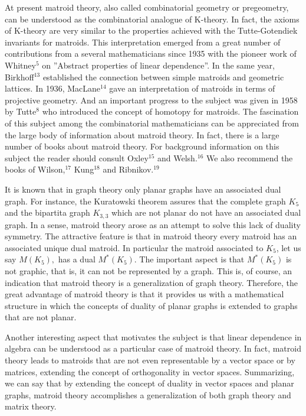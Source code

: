 \documentclass[a4paper,12pt]{article}
\begin{document}
At present matroid theory, also called combinatorial geometry or
pregeometry, can be understood as the combinatorial analogue of K-theory. In
fact, the axioms of K-theory are very similar to the properties achieved
with the Tutte-Gotendiek invariants for matroids. This interpretation
emerged from a great number of contributions from a several mathematicians
since 1935 with the pioneer work of Whitney$^{5}$ on ''Abstract properties
of linear dependence''. In the same year, Birkhoff$^{13}$ established the
connection between simple matroids and geometric lattices. In 1936, MacLane$%
^{14}$ gave an interpretation of matroids in terms of projective geometry.
And an important progress to the subject was given in 1958 by Tutte$^{8}$
who introduced the concept of homotopy for matroids. The fascination of this
subject among the combinatorial mathematicians can be appreciated from the
large body of information about matroid theory. In fact, there is a large
number of books about matroid theory. For background information on this
subject the reader should consult Oxley$^{15}$ and Welsh.$^{16}$ We also
recommend the books of Wilson,$^{17}$ Kung$^{18}$ and Ribnikov.$^{19}$

It is known that in graph theory only planar graphs have an associated dual
graph. For instance, the Kuratowski theorem assures that the complete graph $%
K_{5}$ and the bipartita graph $K_{3,3}$ which are not planar do not have an
associated dual graph. In a sense, matroid theory arose as an attempt to
solve this lack of duality symmetry. The attractive feature is that in
matroid theory every matroid has an associated unique dual matroid. In
particular the matroid associated to $K_{5}$, let us say $M(K_{5}),$ has a
dual $M^{\ast }(K_{5})$. The important aspect is that $M^{\ast }(K_{5})$ is
not graphic, that is, it can not be represented by a graph. This is, of
course, an indication that matroid theory is a generalization of graph
theory. Therefore, the great advantage of matroid theory is that it provides
us with a mathematical structure in which the concepts of duality of planar
graphs is extended to graphs that are not planar.

Another interesting aspect that motivates the subject is that linear
dependence in algebra can be understood as a particular case of matroid
theory. In fact, matroid theory leads to matroids that are not even
representable by a vector space or by matrices, extending the concept of
orthogonality in vector spaces. Summarizing, we can say that by extending
the concept of duality in vector spaces and planar graphs, matroid theory
accomplishes a generalization of both graph theory and matrix theory.
\end{document}
